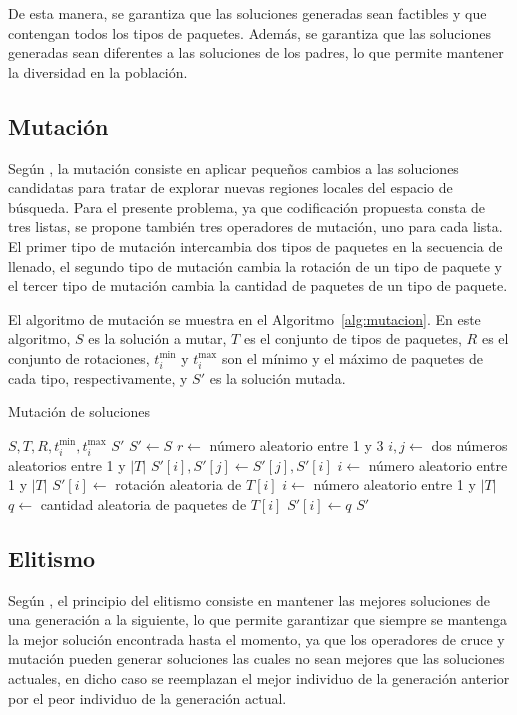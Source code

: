De esta manera, se garantiza que las soluciones generadas sean factibles y que contengan todos los tipos de paquetes. Además, se garantiza que las soluciones generadas sean diferentes a las soluciones de los padres, lo que permite mantener la diversidad en la población.

\subsection{Mutación}

Según \textcite{Dockhorn2022}, la mutación consiste en aplicar pequeños cambios a las soluciones candidatas para tratar de explorar nuevas regiones locales del espacio de búsqueda. Para el presente problema, ya que codificación propuesta consta de tres listas, se propone también tres operadores de mutación, uno para cada lista. El primer tipo de mutación intercambia dos tipos de paquetes en la secuencia de llenado, el segundo tipo de mutación cambia la rotación de un tipo de paquete y el tercer tipo de mutación cambia la cantidad de paquetes de un tipo de paquete.

El algoritmo de mutación se muestra en el Algoritmo~\ref{alg:mutacion}. En este algoritmo, $S$ es la solución a mutar, $T$ es el conjunto de tipos de paquetes, $R$ es el conjunto de rotaciones, $t_i^{\min}$ y $t_i^{\max}$ son el mínimo y el máximo de paquetes de cada tipo, respectivamente, y $S'$ es la solución mutada.

\begin{algorithm}[H]
\caption{Mutación de soluciones}\label{alg:mutacion}
\begin{algorithmic}[1]
\Require $S, T, R, t_i^{\min}, t_i^{\max}$
\Ensure $S'$
\State $S' \leftarrow S$
\State $r \leftarrow$ número aleatorio entre 1 y 3
    \State $i, j \leftarrow$ dos números aleatorios entre 1 y $|T|$
    \State $S'[i], S'[j] \leftarrow S'[j], S'[i]$
    \State $i \leftarrow$ número aleatorio entre 1 y $|T|$
    \State $S'[i] \leftarrow$ rotación aleatoria de $T[i]$
    \State $i \leftarrow$ número aleatorio entre 1 y $|T|$
    \State $q \leftarrow$ cantidad aleatoria de paquetes de $T[i]$
    \State $S'[i] \leftarrow q$
\EndIf
\State \Return $S'$
\end{algorithmic}
\end{algorithm}

\subsection{Elitismo}

Según \textcite{Hasni2013}, el principio del elitismo consiste en mantener las mejores soluciones de una generación a la siguiente, lo que permite garantizar que siempre se mantenga la mejor solución encontrada hasta el momento, ya que los operadores de cruce y mutación pueden generar soluciones las cuales no sean mejores que las soluciones actuales, en dicho caso se reemplazan el mejor individuo de la generación anterior por el peor individuo de la generación actual.